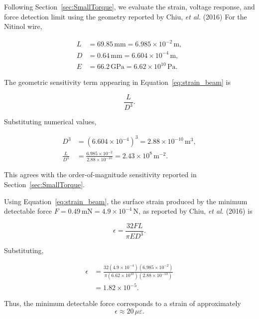 Following Section~\ref{sec:SmallTorque}, we evaluate the strain, voltage response, and force detection limit using the geometry reported by Chiu, \textit{et al.} (2016) \cite{Chiu2016CharacterizationOA} For the Nitinol wire,

\begin{align*}
	L &= 69.85\,\text{mm} = 6.985\times10^{-2}\,\text{m}, \\
	D &= 0.64\,\text{mm} = 6.604\times10^{-4}\,\text{m}, \\
	E &= 66.2\,\text{GPa} = 6.62\times10^{10}\,\text{Pa}.
\end{align*}

The geometric sensitivity term appearing in Equation~\ref{eq:strain_beam} is

\begin{equation}
	\frac{L}{D^3}.
\end{equation}

Substituting numerical values,

\begin{align}
	D^3 &= (6.604\times10^{-4})^3 
	= 2.88\times10^{-10}\,\text{m}^3, \nonumber\\
	\frac{L}{D^3} &= \frac{6.985\times10^{-2}}{2.88\times10^{-10}} 
	= 2.43\times10^{8}\,\text{m}^{-2}.
\end{align}

\noindent This agrees with the order-of-magnitude sensitivity reported in Section~\ref{sec:SmallTorque}.

Using Equation~\ref{eq:strain_beam}, the surface strain produced by the minimum detectable force 
$F = 0.49\,\text{mN} = 4.9\times10^{-4}\,\text{N}$, as reported by Chiu, \textit{et al.} (2016) \cite{Chiu2016CharacterizationOA} is

\begin{equation}
	\epsilon = \frac{32 F L}{\pi E D^3}.
\end{equation}

Substituting,

\begin{align}
	\epsilon &= 
	\frac{32 (4.9\times10^{-4})(6.985\times10^{-2})}
	{\pi (6.62\times10^{10})(2.88\times10^{-10})} \nonumber\\
	&= 1.82\times10^{-5}.
\end{align}

\noindent Thus, the minimum detectable force corresponds to a strain of approximately
\begin{equation}
	\epsilon \approx 20\,\mu\varepsilon.
\end{equation}

